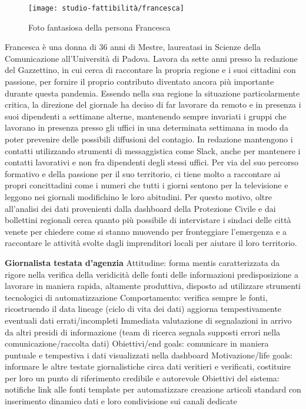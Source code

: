 \begin{wrapfigure}{l}{8cm}
    \texttt{[image: studio-fattibilità/francesca]}
    \caption{Foto fantasiosa della persona Francesca}
\end{wrapfigure}
        
Francesca è una donna di 36 anni di Mestre, laureatasi in Scienze della Comunicazione all'Università di Padova.
Lavora da sette anni presso la redazione del Gazzettino, in cui cerca di raccontare la propria regione e i suoi cittadini con passione, per fornire il proprio contributo diventato ancora più importante durante questa pandemia.
Essendo nella sua regione la situazione particolarmente critica, la direzione del giornale ha deciso di far lavorare da remoto e in presenza i suoi dipendenti a settimane alterne, mantenendo sempre invariati i gruppi che lavorano in presenza presso gli uffici in una determinata settimana in modo da poter prevenire delle possibili diffusioni del contagio. In redazione mantengono i contatti utilizzando strumenti di messaggistica come Slack, anche per mantenere i contatti lavorativi e non fra dipendenti degli stessi uffici.
Per via del suo percorso formativo e della passione per il suo territorio, ci tiene molto a raccontare ai propri concittadini come i numeri che tutti i giorni sentono per la televisione e leggono nei giornali modifichino le loro abitudini. Per questo motivo, oltre all'analisi dei dati provenienti dalla dashboard della Protezione Civile e dai bollettini regionali cerca quanto più possibile di intervistare i sindaci delle città venete per chiedere come si stanno muovendo per fronteggiare l'emergenza e a raccontare le attività svolte dagli imprenditori locali per aiutare il loro territorio.

\textbf{Giornalista testata d'agenzia}
Attitudine:
forma mentis caratterizzata da rigore nella verifica della veridicità delle fonti delle informazioni
predisposizione a lavorare in maniera rapida, altamente produttiva, disposto ad utilizzare strumenti tecnologici di automatizzazione
Comportamento: 
verifica sempre le fonti, ricostruendo il data lineage (ciclo di vita dei dati)
aggiorna tempestivamente eventuali dati errati/incompleti
Immediata valutazione di segnalazioni in arrivo da altri presidi di informazione (team di ricerca segnala supposti errori nella comunicazione/raccolta dati)
Obiettivi/end goals: comunicare in maniera puntuale e tempestiva i dati visualizzati nella dashboard
Motivazione/life goals: informare le altre testate giornalistiche circa dati veritieri e verificati, costituire per loro un punto di riferimento credibile e autorevole
Obiettivi del sistema:
notifiche
link alle fonti
template per automatizzare creazione articoli standard con inserimento dinamico dati e loro condivisione sui canali dedicate

